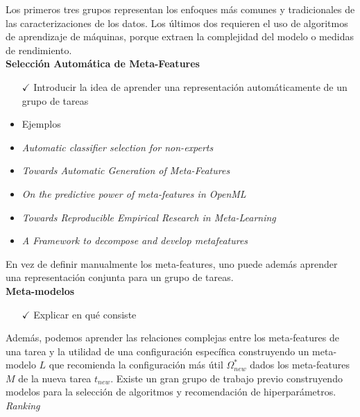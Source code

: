 Los primeros tres grupos representan los enfoques más comunes y tradicionales de las caracterizaciones de los datos. Los últimos dos requieren el uso de algoritmos de aprendizaje de máquinas, porque extraen la complejidad del modelo o medidas de rendimiento. \\

\textbf{Selección Automática de Meta-Features}

\begin{itemize}
	\item[$\checkmark$] Introducir la idea de aprender una representación automáticamente de un grupo de tareas
	\item Ejemplos
	\item \textit{Automatic classifier selection for non-experts}
	\item \textit{Towards Automatic Generation of Meta-Features}
	\item \textit{On the predictive power of meta-features in OpenML}
	\item \textit{Towards Reproducible Empirical Research in Meta-Learning}
	\item \textit{A Framework to decompose and develop metafeatures}
\end{itemize}

En vez de definir manualmente los meta-features, uno puede además aprender una representación conjunta para un grupo de tareas. \\

\textbf{Meta-modelos}

\begin{itemize}
	\item[$\checkmark$] Explicar en qué consiste
\end{itemize}

Además, podemos aprender las relaciones complejas entre los meta-features de una tarea y la utilidad de una configuración específica construyendo un meta-modelo $L$ que recomienda la configuración más útil $\Omega_{new}^*$ dados los meta-features $M$ de la nueva tarea $t_{new}$. Existe un gran grupo de trabajo previo construyendo modelos para la selección de algoritmos y recomendación de hiperparámetros. \\

\textit{Ranking}

